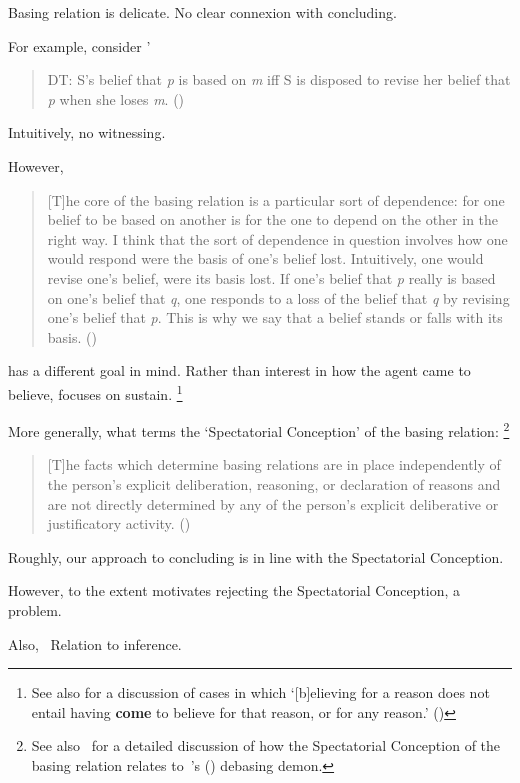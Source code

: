 \begin{note}
  Basing relation is delicate.
  No clear connexion with concluding.

  For example, consider \citeauthor{Evans:2013tw}' 


  \begin{quote}
    DT: S's belief that \emph{p} is based on \emph{m} iff S is disposed to revise her belief that \emph{p} when she loses \emph{m}.%
    \mbox{}\hfill\mbox{(\citeyear[2952]{Evans:2013tw})}
  \end{quote}

  Intuitively, no witnessing.

  However,

  \begin{quote}
    [T]he core of the basing relation is a particular sort of dependence:
    for one belief to be based on another is for the one to depend on the other in the right way.
    I think that the sort of dependence in question involves how one would respond were the basis of one's belief lost.
    Intuitively, one would revise one's belief, were its basis lost.
    If one's belief that \emph{p} really is based on one's belief that \emph{q}, one responds to a loss of the belief that \emph{q} by revising one's belief that \emph{p}.
    This is why we say that a belief stands or falls with its basis.%
    \mbox{}\hfill\mbox{(\citeyear[2951]{Evans:2013tw})}
  \end{quote}

  \citeauthor{Evans:2013tw} has a different goal in mind.
  Rather than interest in how the agent came to believe, \citeauthor{Evans:2013tw} focuses on sustain.%
  \footnote{
    See also \textcite{Audi:1986to} for a discussion of cases in which `[b]elieving for a reason does not entail having \textbf{come} to believe for that reason, or for any reason.' (\citeyear[32--33]{Audi:1986to})
  }
\end{note}

\begin{note}
  More generally, what \citeauthor{Leite:2004uv} terms the `Spectatorial Conception' of the basing relation:%
  \footnote{
    See also~\textcite{Bondy:2018tk} for a detailed discussion of how the Spectatorial Conception of the basing relation relates to~\citeauthor{Schaffer:2010vq}'s (\citeyear{Schaffer:2010vq}) debasing demon.
  }
  \begin{quote}
    [T]he facts which determine basing relations are in place independently of the person’s explicit deliberation, reasoning, or declaration of reasons and are not directly determined by any of the person’s explicit deliberative or justificatory activity.%
    \mbox{}\hfill\mbox{(\citeyear[229]{Leite:2004uv})}
  \end{quote}

  Roughly, our approach to concluding is in line with the Spectatorial Conception.

  However, to the extent \citeauthor{Leite:2004uv} motivates rejecting the Spectatorial Conception, a problem.

  {
    \color{red}
    Also,~\cite{Sylvan:2016wq}
    Relation to inference.
  }
\end{note}

